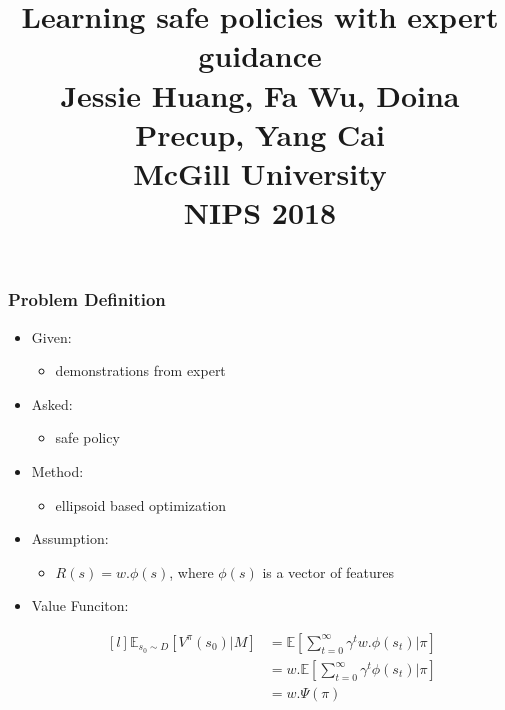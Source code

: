 \documentclass[aspectratio=169]{beamer}
\title{Learning safe policies with expert guidance \\
{\footnotesize Jessie Huang, Fa Wu, Doina Precup, Yang Cai}\\
{\footnotesize McGill University} \\
{\footnotesize NIPS 2018} }
\date{}
\begin{document}
\begin{frame}
	\maketitle

\end{frame}
\begin{frame}
	\frametitle{Problem Definition}
	\begin{itemize}
		\item Given:
			\begin{itemize}
				\item demonstrations from expert
			\end{itemize}
		\item Asked:
			\begin{itemize}
				\item safe policy
			\end{itemize}
		\item Method:
			\begin{itemize}
				\item ellipsoid based optimization
			\end{itemize}
		\item Assumption:
			\begin{itemize}
				\item $R(s) = w.\phi(s)$, where $\phi(s)$ is a vector of features
			\end{itemize}
		\item Value Funciton:

				$$
				\begin{matrix*}[l]
					\mathbb{E}_{s_0 \sim D}[V^\pi (s_0) | M] & = \mathbb{E}[\sum_{t=0}^{\infty}\gamma^t w.\phi(s_t) | \pi] \\
					 & = w.\mathbb{E}[\sum_{t=0}^{\infty}\gamma^t \phi(s_t) | \pi] \\
					 & = w. \Psi(\pi)
				\end{matrix*}
				$$
	\end{itemize}

	
\end{frame}
\end{document}
